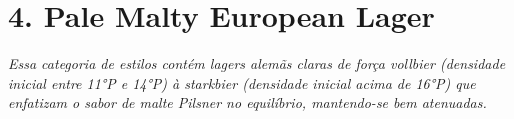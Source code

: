 \section*{4. Pale Malty European Lager}
\textit{Essa categoria de estilos contém lagers alemãs claras de força vollbier (densidade inicial entre 11°P e 14°P) à starkbier (densidade inicial acima de 16°P) que enfatizam o sabor de malte Pilsner no equilíbrio, mantendo-se bem atenuadas.}
